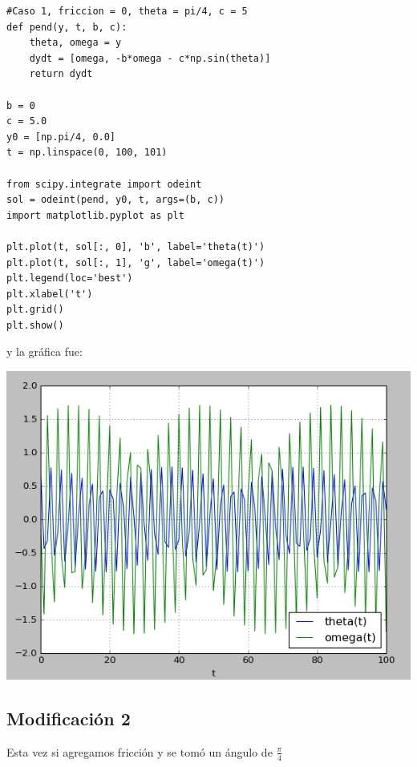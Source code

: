 \documentclass[12pt,letterpaper]{article}
\begin{document}
\begin{verbatim}
#Caso 1, friccion = 0, theta = pi/4, c = 5
def pend(y, t, b, c):
    theta, omega = y
    dydt = [omega, -b*omega - c*np.sin(theta)]
    return dydt
    
b = 0
c = 5.0
y0 = [np.pi/4, 0.0]
t = np.linspace(0, 100, 101)
    
from scipy.integrate import odeint
sol = odeint(pend, y0, t, args=(b, c))
import matplotlib.pyplot as plt
   
plt.plot(t, sol[:, 0], 'b', label='theta(t)')
plt.plot(t, sol[:, 1], 'g', label='omega(t)')
plt.legend(loc='best')
plt.xlabel('t')
plt.grid()
plt.show()
\end{verbatim}

y la gráfica fue: 

\begin{center}
\includegraphics[scale=0.6]{act5caso1.png}
\end{center}

\newpage

\subsection*{Modificación 2}
Esta vez si agregamos fricción y se tomó un ángulo de $\frac{\pi}{4}$
\end{document}
